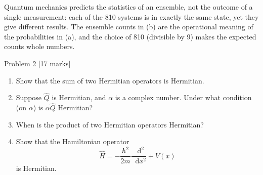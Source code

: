\documentclass[12pt]{article}
\renewcommand{\d}{\mathop{}\!\mathrm{d}}
\begin{document}
\begin{insightbox}
Quantum mechanics predicts the statistics of an ensemble, not the outcome of a single measurement: each of the 810 systems is in exactly the same state, yet they give different results. The ensemble counts in (b) are the operational meaning of the probabilities in (a), and the choice of 810 (divisible by 9) makes the expected counts whole numbers.
\end{insightbox}
\fi

\newpage
\begin{problembox}{Problem 2 \hfill [17 marks]}
\begin{enumerate}
    \item Show that the sum of two Hermitian operators is Hermitian.
    \item Suppose $\hat{Q}$ is Hermitian, and $\alpha$ is a complex number. Under what condition (on $\alpha$) is $\alpha\hat{Q}$ Hermitian?
    \item When is the product of two Hermitian operators Hermitian?
    \item Show that the Hamiltonian operator
    \[
        \hat{H}=-\frac{\hbar^2}{2m}\frac{\d^2}{\d x^2}+V(x)
    \]
    is Hermitian.
\end{enumerate}
\end{problembox}
\end{document}
